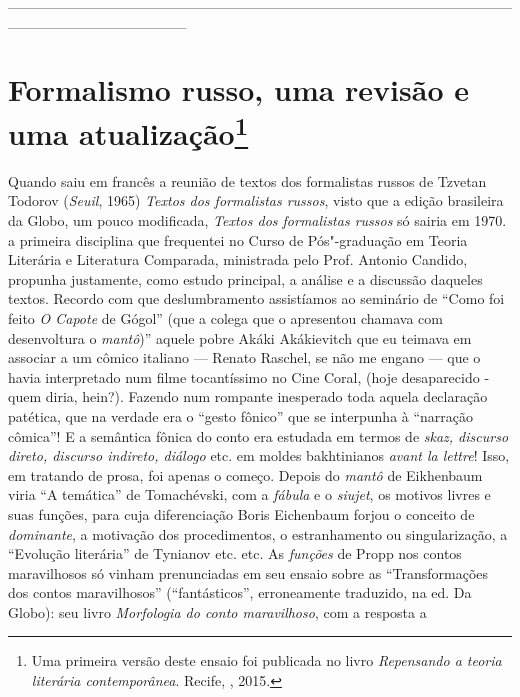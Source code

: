 \_\_\_\_\_\_\_\_\_\_\_\_\_\_\_\_\_\_\_\_\_\_\_\_\_\_\_\_\_\_\_\_\_\_\_\_\_\_\_\_\_\_\_\_\_\_\_\_\_\_\_\_\_\_\_\_\_\_\_\_\_\_\_\_\_

\chapter{Formalismo russo, uma revisão e uma atualização\footnote{Uma
  primeira versão deste ensaio foi publicada no livro \emph{Repensando a
  teoria literária contemporânea}. Recife, , 2015.}}

Quando saiu em francês a reunião de textos dos formalistas russos de
Tzvetan Todorov (\emph{Seuil}, 1965) \emph{Textos dos formalistas
russos}, visto que a edição brasileira da Globo, um pouco modificada,
\emph{Textos dos formalistas russos} só sairia em 1970. a primeira
disciplina que frequentei no Curso de Pós"-graduação em Teoria Literária
e Literatura Comparada, ministrada pelo Prof. Antonio Candido, propunha
justamente, como estudo principal, a análise e a discussão daqueles
textos. Recordo com que deslumbramento assistíamos ao seminário de
``Como foi feito \emph{O Capote} de Gógol'' (que a colega que o
apresentou chamava com desenvoltura o \emph{mantô})'' aquele pobre Akáki
Akákievitch que eu teimava em associar a um cômico italiano --- Renato
Raschel, se não me engano --- que o havia interpretado num filme
tocantíssimo no Cine Coral, (hoje desaparecido - quem diria, hein?).
Fazendo num rompante inesperado toda aquela declaração patética, que na
verdade era o ``gesto fônico'' que se interpunha à ``narração cômica''!
E a semântica fônica do conto era estudada em termos de \emph{skaz,
discurso direto, discurso indireto, diálogo} etc. em moldes bakhtinianos
\emph{avant la lettre}! Isso, em tratando de prosa, foi apenas o começo.
Depois do \emph{mantô} de Eikhenbaum viria ``A temática'' de
Tomachévski, com a \emph{fábula} e o \emph{siujet}, os motivos livres e
suas funções, para cuja diferenciação Boris Eichenbaum forjou o conceito
de \emph{dominante}, a motivação dos procedimentos, o estranhamento ou
singularização, a ``Evolução literária'' de Tynianov etc. etc. As
\emph{funções} de Propp nos contos maravilhosos só vinham prenunciadas
em seu ensaio sobre as ``Transformações dos contos maravilhosos''
(``fantásticos'', erroneamente traduzido, na ed. Da Globo): seu livro
\emph{Morfologia do conto maravilhoso}, com a resposta a
